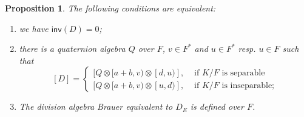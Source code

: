 \documentclass{amsart}
\newtheorem{proposition}[definition]{Proposition}
\numberwithin{equation}{section}
\newcommand{\quat}[1]{[#1)}
\newcommand{\inv}{\mathsf{inv}}
\begin{document}
\begin{proposition} \label{prop_invTrivial}
    The following conditions are equivalent:
    \begin{enumerate}
        \item\label{prop_invTrivial1} we have $\inv(D) = 0$;
        \item\label{prop_invTrivial2} there is a quaternion algebra $Q$ over $F$, $v \in F^\ast$ and $u \in F^\ast$ resp. $u \in F$ such that 
        \[[D] = \begin{cases}
            [Q \otimes \quat{a + b, v} \otimes \quat{d, u}], & \text{ if $K/F$ is separable}\\
            [Q \otimes \quat{a + b, v} \otimes \quat{u, d}], & \text{ if $K/F$ is inseparable;}
            \end{cases}
        \]
        \item\label{prop_invTrivial3} The division algebra Brauer equivalent to $D_E$ is defined over $F$. 
    \end{enumerate}
\end{proposition}
\end{document}
